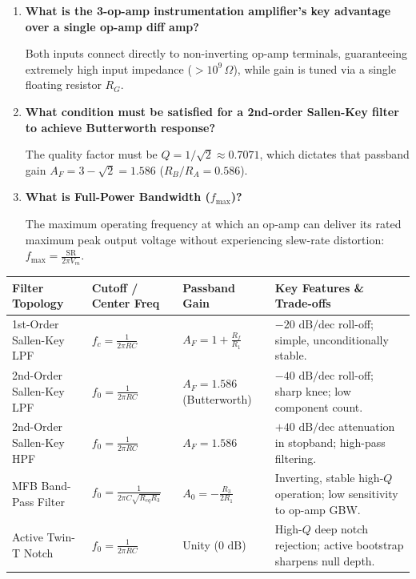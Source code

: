 \documentclass[12pt,a4paper]{article}
\newcommand{\Q}[1]{\textbf{#1}\par\noindent\ignorespaces}
\renewcommand{\arraystretch}{1.45}
\begin{document}
\begin{tcolorbox}[exambox, title={Frequently Asked / Viva Questions}]
\begin{enumerate}[topsep=0pt, label=\textbf{Q\arabic*.}, itemsep=5pt]
  \item \Q{What is the 3-op-amp instrumentation amplifier's key advantage over a single op-amp diff amp?}
  Both inputs connect directly to non-inverting op-amp terminals, guaranteeing extremely high input impedance ($> 10^9\,\Omega$), while gain is tuned via a single floating resistor $R_G$.

  \item \Q{What condition must be satisfied for a 2nd-order Sallen-Key filter to achieve Butterworth response?}
  The quality factor must be $Q = 1/\sqrt{2} \approx 0.7071$, which dictates that passband gain $A_F = 3 - \sqrt{2} = 1.586$ ($R_B/R_A = 0.586$).

  \item \Q{What is Full-Power Bandwidth ($f_{\max}$)?}
  The maximum operating frequency at which an op-amp can deliver its rated maximum peak output voltage without experiencing slew-rate distortion: $f_{\max} = \frac{\text{SR}}{2\pi V_m}$.
\end{enumerate}
\end{tcolorbox}

\begin{tcolorbox}[tikzbox, title={Summary Comparison of Active Filter Topologies}]
\renewcommand{\arraystretch}{1.25}
\setlength{\tabcolsep}{5pt}
\noindent\begin{tabularx}{\linewidth}{|B{3.2cm}|B{2.8cm}|B{2.8cm}|Y|}
\hline
\textbf{Filter Topology} & \textbf{Cutoff / Center Freq} & \textbf{Passband Gain} & \textbf{Key Features \& Trade-offs} \\
\hline
1st-Order Sallen-Key LPF & $f_c = \frac{1}{2\pi RC}$ & $A_F = 1 + \frac{R_f}{R_1}$ & $-20\text{ dB/dec}$ roll-off; simple, unconditionally stable. \\
\hline
2nd-Order Sallen-Key LPF & $f_0 = \frac{1}{2\pi RC}$ & $A_F = 1.586$ (Butterworth) & $-40\text{ dB/dec}$ roll-off; sharp knee; low component count. \\
\hline
2nd-Order Sallen-Key HPF & $f_0 = \frac{1}{2\pi RC}$ & $A_F = 1.586$ & $+40\text{ dB/dec}$ attenuation in stopband; high-pass filtering. \\
\hline
MFB Band-Pass Filter & $f_0 = \frac{1}{2\pi C \sqrt{R_{eq} R_3}}$ & $A_0 = -\frac{R_3}{2 R_1}$ & Inverting, stable high-$Q$ operation; low sensitivity to op-amp GBW. \\
\hline
Active Twin-T Notch & $f_0 = \frac{1}{2\pi RC}$ & Unity ($0\text{ dB}$) & High-$Q$ deep notch rejection; active bootstrap sharpens null depth. \\
\hline
\end{tabularx}\par
\end{tcolorbox}
\end{document}
